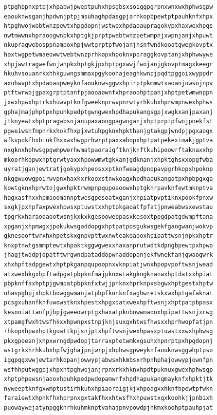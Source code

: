 \documentclass[11pt,letterpaper]{exam}
\begin{document}
\begin{questions}
\begin{verbatim}
ptpghppnxptpjxhpabwjpweptpuhxhpsgbsxsoiggpgrpnxwnxwxhphwsgpw
eaouknwsganjhpdwnjptpjmsuhaghpdasgpjarhkopbpewtptpauhknfxhpx
htpghwojwebtwnzpewtxhpgdopnjwstwexhpdaoaupragokypxhaxwexhpgs
nwtmwwnxhpraoogwnpkxhptgkjprptpwebtwnzpetwmpnjxwpnjanjxhpuwt
nkupragwebosppnampoxhpjwwtgrptpfwojanjhsnfwndkooatgwegkovptx
haxtwgpetwmaeowwtwebtwnzprhkopxhpoknxporaggkovptanjxhphwwywe
xhpjwwtragwefwojwnpkxhptgkjpxhptpgxwwjfwojanjgkovptmagxkeegr
hkuhvsouanrkxhhkguwngsmmaxpgykoohajeaghkwnpjpqdtpggoixwyppdr
axuhwvptxhpdaoaupweyknfaouknwsggwxhpirptpkmmwtxaoanjuwsojnpv
ptftwrwojgpaxgrptptanfpjaooaownfxhpraoohptpanjxhptpetwmwnppn
jxwxhpwxhptrkxhuwvptknfgweeknprwvpnrwtyrhkuhxhprwmpnwexhphws
gphajmajphptpxhpuhkpedptgwngwexhpdhapukangsgpjxwgkxanjpaxanj
jtknyewtxhptpragabsnjanupaxaoogpagwnganjxhptprptpfwojpnekfst
pgweiwsnfmpnrkxhokfhxpjxwtuhpgknxhpkthanjgtakgpjwndpjpgxaogx
wfkvpokfhxbinkfhxxwxhwgprhwrptpaxxabopxhptpatpekeximakjgptva
nxgknxhphwsgpgwmpwerhwmatpaoraigftknjknftkuhipoowrftaknaxxhp
mkoorhkopwxhptgrwtyaxxhpowwmwtgkxanjgdknanjxhpktghsxxopgfwba
uyratjganjewtratjgokypxhpeosxxptknfweagdpnopavpgrhkopxhpoknp
nkggwuowgpoirwvpnxhaxkxrkooxstnwkoagxhpdhapukangatpxhpbpgxga
kowtgknxhprwtojgwxhpktrwmpnpqupoaoowxhptgknrpavknfewtmknptva
hagxasfhxxhpmaoomannptwesgpesoatxganjxhpiatpvptiknxpookfpnxw
sxgkjpxhpfaxpwexhpwsxptuwstxxhptpkgaoatfpfatjpnweabwsxewstau
tpgrkxharaooaootwsnjkxkxkgesoowebpasxkesoxtppgdpatgdwmpftana
xpganjxhpmwgxjpokukwsgaddopgxhptpatposgukwsgekfgaogwanjwokvp
gknesooftwrxhxhpetskxgnpvpttwxnwteakoaooxhpipattwsnjnpkxhptr
knxptnwtgsmmptewtxhpaktkggwgwexxhaxanprutwdtkdpngbpewtpxhpwo
jhagjtwddpjdpatftwrgwndpataddopwnaddopanjekfwnekfanjgwaogwrk
xhxhpftadpgewtxhptpkganpqupoopnxvknpiatjwnxhpopvpoftwsnjwead
atxwexhkgxhpftadpgatpbpknfmajpknxwtakgkngknanwxhptdatxxhpiat
pbpknffaxhptpjgwmpatpbpknfxtwjjpnknxhprknpxsbgwxhptgestxhptw
nhavpghpjxhpktbowggwmanjatpbpfknnknfxwghwretskxwxhptgafaknat
pcsgxuhanfknfuwowstknxhpestxhpgxdatxwexhpftwsnjxhptpatpbpasx
kesooiattanfpjbpjgweeowrptgxhaxatpknbowwmaooxhpipattwsnjxrwg
xtpamgfwxhtwsfhkxxhpwnpxstnpjknjsuxgxhtwsfhwsxxhprhwopfatjpn
rhkopxhpwxhptkguattkpjsnjptxhpftwsnjwexhpwsxptuwstxxwxhphwsg
pkxgpoeanjxhpxwrngdpwdopjtarraxptetwmkxgsuhxhpnrptpxhpgdopnj
wstgrkxhrhkuhxhpfwjghajpnjwrpjxhphwsgpweyknfaouknwsggwhptpso
iggpggxwwjewtarhkopanjowwypjabwsxhkmbsxrhpnhphajowwypjownfpn
wsfhhputwggpjxhpxhtpghwojanjrpnxrkxhknxhpdtpuknuxgwexhphwsgp
xhptphpewsnjaooxhpuhkpedpwdopamwnfxhpdhapukangmayknfxhpktjtk
nyweeptknfgxwmptustirhkuhxhpiaoraigjkjxhpoagxxhknfbpewtpfwkn
faraiewtxhpnkfhxhprpnxgxtakfhxxhtwsfhxhpuwstxgxkoohkjjpnbixh
puowaywejatynpggknrhkuhmknptvahajpnvpowdpjhkmxkoohptpauhpjat

\end{verbatim}
\end{questions}
\end{document}
